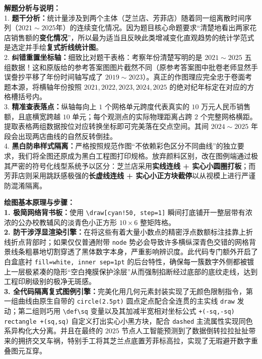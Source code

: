 {\small\color{gray}
\textbf{解题分析与说明：}\\
1. \textbf{题干分析：}统计量涉及到两个主体（芝兰店、芳菲店）随着同一组离散时间序列（$2021\sim 2025$年）的连续变化情况。因为题目核心命题要求“清楚地看出两家花店销售额的\textbf{变化情况}”，所以最为适当且反映此类增减变化直观趋势的统计学范式是选定并手绘\textbf{复式折线统计图}。\\
2. \textbf{纠错重置坐标轴：}细致比对题干表格：考察年份清楚写明的是 $2021\sim 2025$ 五组数据！这和原版给的参考答案图图片截然不同（原参考答案图中批卷老师显然手误誊抄平移了年份时间轴写成了 $2019\sim 2023$）。真正的作图理应完全忠于卷面考题本源，将横轴年份按照 $2021, 2022, 2023, 2024, 2025$ 的绝对纪年标定在对应的方格槽括号内。\\
3. \textbf{精准查表落点：}纵轴每向上 $1$ 个网格单元跨度代表真实的 $10$ 万元人民币销售额，且底横宽跨越 $10$ 单元；每个观测点的实际物理距离占跨 $2$ 个完整网格横距。提取表格两组数据按位对应转换坐标即可完美落在交点空间。其间 $2024\sim 2025$ 年段会出现两店曲线的自然反转倒挂。\\
4. \textbf{黑白防串样式隔离：}严格按照规范作图“不依赖彩色区分不同曲线”的独立要求，我们将全图还原成为黑白工程图打印规格。放弃颜料区别，改在图例端通过极其严密的符号化线型系统予以区分：芝兰店采用\textbf{实线连线 + 实心小圆圈打板}；而芳菲店则采用跳跃感极强的\textbf{长虚线连线 + 实心小正方块截停}以从视模上进行严谨防混淆隔离。
}

\vspace{0.6cm}

{\small\color{blue!70!black}
\textbf{绘图基本原理与步骤：}\\
\textbf{1. 极简网络背书板：}使用 \texttt{\textbackslash draw[cyan!50, step=1]} 瞬间打底铺开一整层带有浓浓的公办校教辅风的淡青色小正方形 $10\times 6$ 整矩阵格。\\
\textbf{2. 防干涉浮显渲染引擎：}在将这些有着大量小数点的精密浮点数额标注挂靠上折线折点背部时；如果仅仅普通附带 \texttt{node} 势必会导致许多横纵深青色交错的网格背景线条粗暴地切割穿透了黑体数字本身，严重影响辨识度。此代码专门额外开启了白盒底衬 \texttt{fill=white, inner sep=1pt} 的后台特性，确保每一簇数字外侧都被镀上一层极紧凑的隐形“空白掩膜保护涂层”从而强制掐断经过底部的底纹走线，达到工程印刷级别的极净无斑感。\\
\textbf{3. 全代码隔离复式图例引擎：}完美化用几何元素封装实现了无颜色限制指令，第一组曲线由原生自带的 \texttt{circle(2.5pt)} 圆点定点配合全连贯的主实线 \texttt{draw} 发动；第二组则巧用 \texttt{\textbackslash def\textbackslash sq} 变量以及其加减半宽相对坐标公式 \texttt{+(-sq,-sq) rectangle +(sq,sq)} 自定义打出实心小黑方块，配合 \texttt{dashed} 主流属性实现同色系异构化大分离。并且在最终的 $2025$ 节点人工智能预测到了数据倒转拉拉扯扯带来的拥挤交叉车祸，特别手工将其芝兰点底置芳菲标高拉，实现了无瑕避开数字重叠图元互穿。
}

